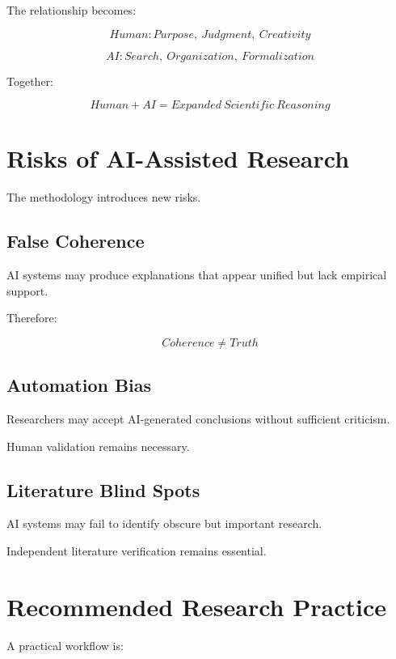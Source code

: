 \documentclass[11pt]{article}
\begin{document}
The relationship becomes:


\[
Human:
Purpose,\ Judgment,\ Creativity
\]


\[
AI:
Search,\ Organization,\ Formalization
\]


Together:


\[
Human+AI
=
Expanded\ Scientific\ Reasoning
\]



\section{Risks of AI-Assisted Research}


The methodology introduces new risks.



\subsection{False Coherence}


AI systems may produce explanations that appear unified but lack
empirical support.


Therefore:


\[
Coherence
\neq
Truth
\]



\subsection{Automation Bias}


Researchers may accept AI-generated conclusions without sufficient
criticism.


Human validation remains necessary.



\subsection{Literature Blind Spots}


AI systems may fail to identify obscure but important research.


Independent literature verification remains essential.



\section{Recommended Research Practice}


A practical workflow is:
\end{document}
